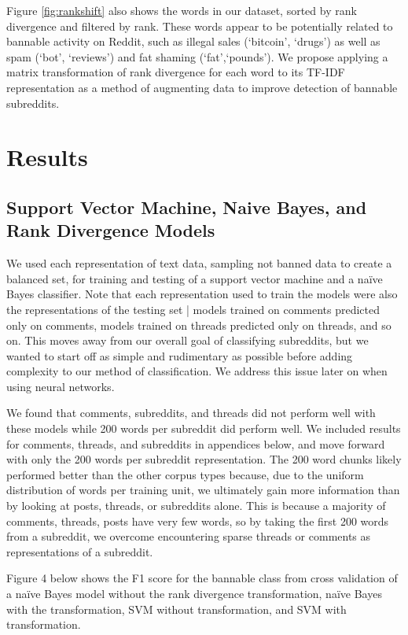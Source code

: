 \documentclass[11pt]{article}[twocolumn]
\begin{document}
Figure \ref{fig:rankshift} also shows the words in our dataset, sorted by rank divergence and filtered by rank.  These words appear to be potentially related to bannable activity on Reddit, such as illegal sales (`bitcoin', `drugs') as well as spam (`bot', `reviews') and fat shaming (`fat',`pounds').  We propose applying a matrix transformation of rank divergence for each word to its TF-IDF representation as a method of augmenting data to improve detection of bannable subreddits.

\section{Results}

\subsection{Support Vector Machine, Naive Bayes, and Rank Divergence Models}

We used each representation of text data, sampling not banned data to create a balanced set, for training and testing of a support vector machine and a na\"ive Bayes classifier.  Note that each representation used to train the models were also the representations of the testing set | models trained on comments predicted only on comments, models trained on threads predicted only on threads, and so on.  This moves away from our overall goal of classifying subreddits, but we wanted to start off as simple and rudimentary as possible before adding complexity to our method of classification.  We address this issue later on when using neural networks.


We found that comments, subreddits, and threads did not perform well with these models while 200 words per subreddit did perform well.  We included results for comments, threads, and subreddits in appendices below, and move forward with only the 200 words per subreddit representation.  The 200 word chunks likely performed better than the other corpus types because, due to the uniform distribution of words per training unit, we ultimately gain more information than by looking at posts, threads, or subreddits alone.  This is because a majority of comments, threads, posts have very few words, so by taking the first 200 words from a subreddit, we overcome encountering sparse threads or comments as representations of a subreddit.

Figure 4 below shows the F1 score for the bannable class from cross validation of a na\"ive Bayes model without the rank divergence transformation, na\"ive Bayes with the transformation, SVM without transformation, and SVM with transformation.
\end{document}
